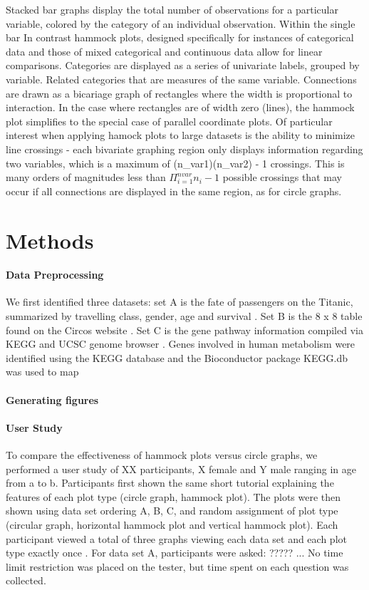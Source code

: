 \documentclass{vgtc}                          %
\begin{document}
Stacked bar graphs display the total number of observations for a particular variable, colored by the category of an individual observation. Within the single bar
In contrast hammock plots, designed specifically for instances of categorical data and those of mixed categorical and continuous data \cite{hammock} allow for linear comparisons. Categories are displayed as a series of univariate labels, grouped  by variable. Related categories that are measures of the same variable. Connections are drawn as a bicariage graph of rectangles where the width is proportional to interaction.  In the case where rectangles are of width zero (lines), the hammock plot simplifies to the special case of parallel coordinate plots. Of particular interest when applying hamock plots to large datasets is the ability to minimize line crossings - each bivariate graphing region only displays information regarding two variables, which is a maximum of (n\_var1)(n\_var2) - 1 crossings. This is many orders of magnitudes less than $\Pi_{i = 1}^{nvar}n_{i} - 1$ possible crossings that may occur if all connections are displayed in the same region, as for circle graphs.
\section{Methods}
\paragraph{Data Preprocessing}
We first identified three datasets: set A is the fate of passengers on the Titanic, summarized by travelling class, gender, age and survival \cite{titanic}. Set B is the 8 x 8 table found on the Circos website \cite{circosdata}. Set C is the gene pathway information compiled via KEGG \cite{KEGG12} \cite{KEGG00} and UCSC genome browser \cite{ucsc02} \cite{ucsc10}. Genes involved in human metabolism were identified using the KEGG database and the Bioconductor package KEGG.db \cite{keggdb} was used to map

\paragraph{Generating figures}
\paragraph{User Study} To compare the effectiveness of hammock plots versus circle graphs, we performed a user study of XX participants, X female and Y male ranging in age from a to b.  Participants first shown the same short tutorial explaining the features of each plot type (circle graph, hammock plot). The plots were then shown using data set ordering A, B, C, and random assignment of plot type (circular graph, horizontal hammock plot and vertical hammock plot). Each participant viewed a total of three graphs viewing each data set and each plot type exactly once . For data set A, participants were asked: ????? ... No time limit restriction was placed on the tester, but time spent on each question was collected.
\end{document}

